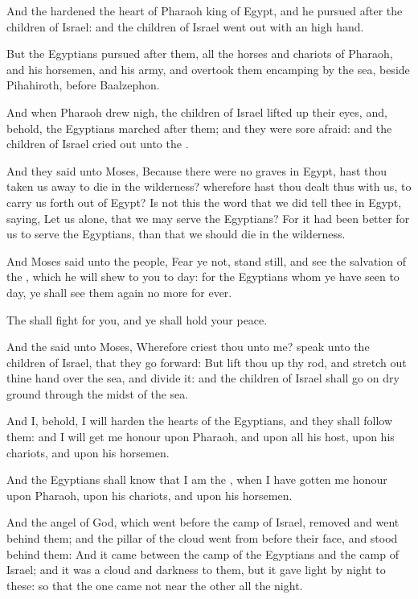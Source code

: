 \Verse And the \LORD hardened the heart of Pharaoh king of Egypt, and he pursued after the children of Israel: and the children of Israel went out with an high hand.

\Verse But the Egyptians pursued after them, all the horses and chariots of Pharaoh, and his horsemen, and his army, and overtook them encamping by the sea, beside Pihahiroth, before Baalzephon.

\Verse And when Pharaoh drew nigh, the children of Israel lifted up their eyes, and, behold, the Egyptians marched after them; and they were sore afraid: and the children of Israel cried out unto the \LORD.

\Verse And they said unto Moses, Because there were no graves in Egypt, hast thou taken us away to die in the wilderness? wherefore hast thou dealt thus with us, to carry us forth out of Egypt?  \Verse Is not this the word that we did tell thee in Egypt, saying, Let us alone, that we may serve the Egyptians? For it had been better for us to serve the Egyptians, than that we should die in the wilderness.

\Verse And Moses said unto the people, Fear ye not, stand still, and see the salvation of the \LORD, which he will shew to you to day: for the Egyptians whom ye have seen to day, ye shall see them again no more for ever.

\Verse The \LORD shall fight for you, and ye shall hold your peace.

\Verse And the \LORD said unto Moses, Wherefore criest thou unto me?  speak unto the children of Israel, that they go forward: \Verse But lift thou up thy rod, and stretch out thine hand over the sea, and divide it: and the children of Israel shall go on dry ground through the midst of the sea.

\Verse And I, behold, I will harden the hearts of the Egyptians, and they shall follow them: and I will get me honour upon Pharaoh, and upon all his host, upon his chariots, and upon his horsemen.

\Verse And the Egyptians shall know that I am the \LORD, when I have gotten me honour upon Pharaoh, upon his chariots, and upon his horsemen.

\Verse And the angel of God, which went before the camp of Israel, removed and went behind them; and the pillar of the cloud went from before their face, and stood behind them: \Verse And it came between the camp of the Egyptians and the camp of Israel; and it was a cloud and darkness to them, but it gave light by night to these: so that the one came not near the other all the night.

